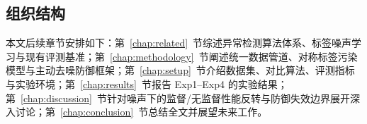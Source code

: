 \subsection{组织结构}
本文后续章节安排如下：第~\ref{chap:related}~节综述异常检测算法体系、标签噪声学习与现有评测基准；第~\ref{chap:methodology}~节阐述统一数据管道、对称标签污染模型与主动去噪防御框架；第~\ref{chap:setup}~节介绍数据集、对比算法、评测指标与实验环境；第~\ref{chap:results}~节报告 Exp1--Exp4 的实验结果；第~\ref{chap:discussion}~节针对噪声下的监督/无监督性能反转与防御失效边界展开深入讨论；第~\ref{chap:conclusion}~节总结全文并展望未来工作。
